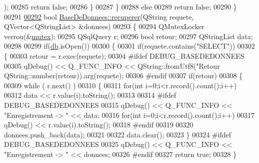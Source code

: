 \begin{DoxyCode}
{{{{{{{{{{{{{      );
00285             \textcolor{keywordflow}{return} \textcolor{keyword}{false};
00286         \}
00287     \}
00288     \textcolor{keywordflow}{else}
00289         \textcolor{keywordflow}{return} \textcolor{keyword}{false};
00290 \}
00291 
\hyperlink{class_base_de_donnees_a68dd0d62ba03b9e8e5aa759d0666cb59}{00292} \textcolor{keywordtype}{bool} \hyperlink{class_base_de_donnees_a77539baad389f5acf754cd2cd452403e}{BaseDeDonnees::recuperer}(QString requete, QVector<QStringList> &donnees)
00293 \{
00294     QMutexLocker verrou(&\hyperlink{class_base_de_donnees_aa1b4696fac87a740f914aa73739086f2}{mutex});
00295     QSqlQuery r;
00296     \textcolor{keywordtype}{bool} retour;
00297     QStringList data;
00298 
00299     \textcolor{keywordflow}{if}(\hyperlink{class_base_de_donnees_a3e738dcf443370c46a541677ab619f06}{db}.isOpen())
00300     \{
00301         \textcolor{keywordflow}{if}(requete.contains(\textcolor{stringliteral}{"SELECT"}))
00302         \{
00303             retour = r.exec(requete);
00304 \textcolor{preprocessor}{            #ifdef DEBUG\_BASEDEDONNEES}
00305             qDebug() << Q\_FUNC\_INFO << QString::fromUtf8(\textcolor{stringliteral}{"Retour %
      QString::number(retour)).arg(requete);
00306 \textcolor{preprocessor}{            #endif}
00307             \textcolor{keywordflow}{if}(retour)
00308             \{
00309                 \textcolor{keywordflow}{while} ( r.next() )
00310                 \{
00311                     \textcolor{keywordflow}{for}(\textcolor{keywordtype}{int} i=0;i<r.record().count();i++)
00312                         data << r.value(i).toString();
00313 
00314 \textcolor{preprocessor}{                    #ifdef DEBUG\_BASEDEDONNEES}
00315                     qDebug() << Q\_FUNC\_INFO << \textcolor{stringliteral}{"Enregistrement -> "} << data;
00316                     \textcolor{keywordflow}{for}(\textcolor{keywordtype}{int} i=0;i<r.record().count();i++)
00317                         qDebug() << r.value(i).toString();
00318 \textcolor{preprocessor}{                    #endif}
00319 
00320                     donnees.push\_back(data);
00321 
00322                     data.clear();
00323                 \}
00324 \textcolor{preprocessor}{                #ifdef DEBUG\_BASEDEDONNEES}
00325                 qDebug() << Q\_FUNC\_INFO << \textcolor{stringliteral}{"Enregistrement -> "} << donnees;
00326 \textcolor{preprocessor}{                #endif}
00327                 \textcolor{keywordflow}{return} \textcolor{keyword}{true};
00328             \}
}}}}}}}}}}}}}}
\end{DoxyCode}
